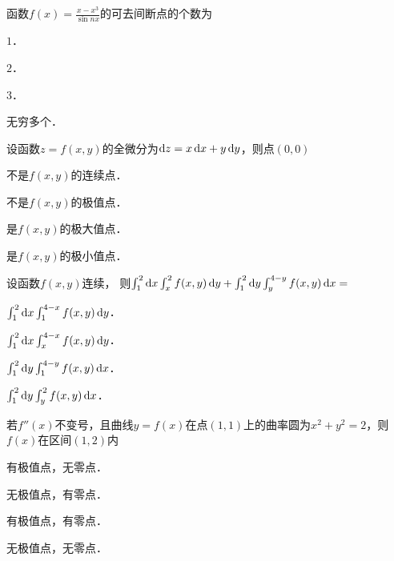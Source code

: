 \documentclass[plain,noanswer,medmath]{../../template/jnuexam}
\begin{document}






\begin{problem}
函数$f(x) = \frac{x - x^3}{\sin nx}$的可去间断点的个数为\pickout{}
\begin{abcd}
\item $1$．
\item $2$．
\item $3$．
\item 无穷多个．
\end{abcd}
\end{problem}




\begin{problem}
设函数$z = f\left(x,y \right)$的全微分为$\mathop{}\!\mathrm{d} z = x\mathop{}\!\mathrm{d} x + y\mathop{}\!\mathrm{d} y$，则点$\left(0,0 \right)$\pickout{}
\begin{abcd}
\item 不是$f\left(x,y \right)$的连续点．
\item 不是$f\left(x,y \right)$的极值点．
\item 是$f\left(x,y \right)$的极大值点．
\item 是$f\left(x,y \right)$的极小值点．
\end{abcd}
\end{problem}


\begin{problem}
设函数$f\left(x,y \right)$连续，
则$\int_1^2 \mathop{}\!\mathrm{d} x \int_x^2 f(x,y)\mathop{}\!\mathrm{d} y + \int_1^2 \mathop{}\!\mathrm{d} y \int_y^{4 - y} f(x,y)\mathop{}\!\mathrm{d} x =$\pickout{}
\begin{abcd}
\item $\int_1^2 \mathop{}\!\mathrm{d} x \int_1^{4 - x} f(x,y)\mathop{}\!\mathrm{d} y$．
\item $\int_1^2 \mathop{}\!\mathrm{d} x \int_x^{4 - x} f(x,y)\mathop{}\!\mathrm{d} y$．
\item $\int_1^2 \mathop{}\!\mathrm{d} y \int_1^{4 - y} f(x,y)\mathop{}\!\mathrm{d} x$．
\item $\int_1^2 \mathop{}\!\mathrm{d} y \int_y^2 f(x,y)\mathop{}\!\mathrm{d} x$．
\end{abcd}
\end{problem}


\begin{problem}
若$f''(x)$不变号，且曲线$y = f(x)$在点$\left(1,1 \right)$上的曲率圆为$x^2 + y^2 = 2$，则$f(x)$在区间$\left(1,2 \right)$内\pickout{}
\begin{abcd}
\item 有极值点，无零点．
\item 无极值点，有零点．
\item 有极值点，有零点．
\item 无极值点，无零点．
\end{abcd}
\end{problem}
\end{document}
